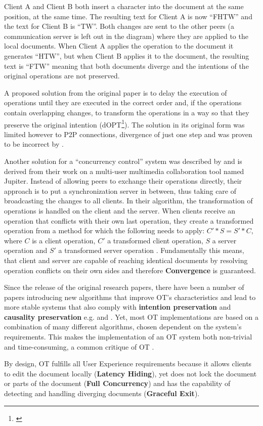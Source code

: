 Client A and Client B both insert a character into the document at the same position, at the same time. The resulting text for Client A is now ``FHTW'' and the text for Client B is ``TW''. Both changes are sent to the other peers (a communication server is left out in the diagram) where they are applied to the local documents. When Client A applies the operation to the document it generates ``HTW'', but when Client B applies it to the document, the resulting text is ``FTW'' meaning that both documents diverge and the intentions of the original operations are not preserved.

A proposed solution from the original paper is to delay the execution of operations until they are executed in the correct order and, if the operations contain overlapping changes, to transform the operations in a way so that they preserve the original intention (dOPT\footnote{\cite[p. 403f]{ellis89groupware}}). The solution in its original form was limited however to P2P connections, divergence of just one step and was proven to be incorrect by \cite{cormack1995counterexample}. 

Another solution for a ``concurrency control'' system was described by \cite{nichols95jupiter} and is derived from their work on a multi-user multimedia collaboration tool named Jupiter. Instead of allowing peers to exchange their operations directly, their approach is to put a synchronization server in between, thus taking care of broadcasting the changes to all clients. In their algorithm, the transformation of operations is handled on the client and the server. When clients receive an operation that conflicts with their own last operation, they create a transformed operation from a  method for which the following needs to apply: $C' * S = S' * C$, where $C$ is a client operation, $C'$ a transformed client operation, $S$ a server operation and $S'$ a transformed server operation \cite[6:30min]{whitelaw2009ot}. Fundamentally this means, that client and server are capable of reaching identical documents by resolving operation conflicts on their own sides and therefore \textbf{Convergence} is guaranteed.

Since the release of the original research papers, there have been a number of papers introducing new algorithms that improve OT's characteristics and lead to more stable systems that also comply with \textbf{intention preservation} and \textbf{causality preservation} e.g. \cite{sun1998achieving} and \cite{wang2010wave}. 
Yet, most OT implementations are based on a combination of many different algorithms, chosen dependent on the system's requirements. This makes the implementation of an OT system both non-trivial and time-consuming, a common critique of OT \cite{gentle2011sharejs}.

By design, OT fulfills all User Experience requirements because it allows clients to edit the document locally (\textbf{Latency Hiding}), yet does not lock the document or parts of the document (\textbf{Full Concurrency}) and has the capability of detecting and handling diverging documents (\textbf{Graceful Exit}).